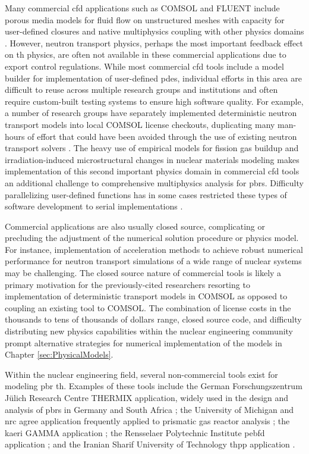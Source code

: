 Many commercial \gls{cfd} applications such as COMSOL and FLUENT include porous media models for fluid flow on unstructured meshes with capacity for user-defined closures and native multiphysics coupling with other physics domains \cite{comsol_cfd,fluent}. However, neutron transport physics, perhaps the most important feedback effect on \gls{th} physics, are often not available in these commercial applications due to export control regulations. While most commercial \gls{cfd} tools include a model builder for implementation of user-defined \glspl{pde}, individual efforts in this area are difficult to reuse across multiple research groups and institutions and often require custom-built testing systems to ensure high software quality. For example, a number of research groups have separately implemented deterministic neutron transport models into local COMSOL license checkouts, duplicating many man-hours of effort that could have been avoided through the use of existing neutron transport solvers \cite{xin_wang,hurt,chandler,xoubi,fiorina}. The heavy use of empirical models for fission gas buildup and irradiation-induced microstructural changes in nuclear materials modeling makes implementation of this second important physics domain in commercial \gls{cfd} tools an additional challenge to comprehensive multiphysics analysis for \glspl{pbr}. Difficulty parallelizing user-defined functions has in some cases restricted these types of software development to serial implementations \cite{becker}.

Commercial applications are also usually closed source, complicating or precluding the adjustment of the numerical solution procedure or physics model. For instance, implementation of acceleration methods to achieve robust numerical performance for neutron transport simulations of a wide range of nuclear systems \cite{willert} may be challenging. The closed source nature of commercial tools is likely a primary motivation for the previously-cited researchers resorting to implementation of deterministic transport models in COMSOL as opposed to coupling an existing tool to COMSOL. The combination of license costs in the thousands to tens of thousands of dollars range, closed source code, and difficulty distributing new physics capabilities within the nuclear engineering community prompt alternative strategies for numerical implementation of the models in Chapter \ref{sec:PhysicalModels}.

Within the nuclear engineering field, several non-commercial tools exist for modeling \gls{pbr} \gls{th}. Examples of these tools include the German Forschungszentrum J{\"u}lich Research Centre THERMIX application, widely used in the design and analysis of \glspl{pbr} in Germany and South Africa \cite{gao,tecdoc1163,THERMIX, zwaan}; the University of Michigan and \gls{nrc} \gls{agree} application frequently applied to prismatic gas reactor analysis \cite{seker}; the \gls{kaeri} GAMMA application \cite{lim}; the Rensselaer Polytechnic Institute \gls{pebfd} application \cite{y_li}; and the Iranian Sharif University of Technology \gls{thpp} application \cite{nouri}.

